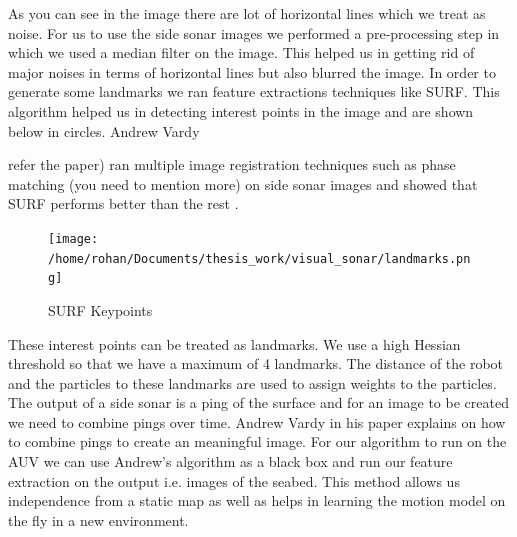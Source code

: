 \documentclass[12pt]{dalcsthesis}
\begin{document}
As you can see in the image there are lot of horizontal lines which we treat as noise. For us to use the side sonar images we performed a pre-processing step in which we used a median filter on the image. This helped us in getting rid of major noises in terms of horizontal lines but also blurred the image. In order to generate some landmarks we ran feature extractions techniques like SURF. This algorithm helped us in detecting interest points in the image and are shown below in circles. Andrew Vardy{refer the paper) ran multiple image registration techniques such as phase matching (you need to mention more) on side sonar images and showed that SURF performs better than the rest .
\begin{figure}[hbtp]
\caption{SURF Keypoints}
\centering
\texttt{[image: /home/rohan/Documents/thesis\_work/visual\_sonar/landmarks.png]}
\end{figure}

These interest points can be treated as landmarks. We use a high Hessian
threshold so that we have a maximum of 4 landmarks. The distance of the robot and the particles to these landmarks are used to assign weights to the particles.
\\
The output of a side sonar is a ping of the surface and for an image to be created we need to combine pings over time. Andrew Vardy in his paper explains on how to combine pings to create an meaningful image. For our algorithm to run on the AUV we can use Andrew's algorithm as a black box and run our feature extraction on the output i.e. images of the seabed. 
This method allows us independence from a static map as well as helps in learning
the motion model on the fly in a new environment. 
}
\end{document}
